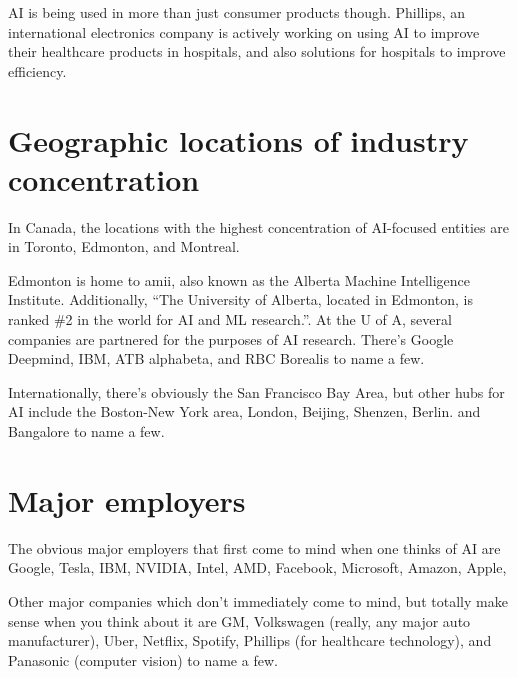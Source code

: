 \documentclass[letterpaper,12pt]{article}
\begin{document}
AI is being used in more than just consumer products though. Phillips,
an international electronics company is actively working on using
AI to improve their healthcare products in hospitals, and also 
solutions for hospitals to improve efficiency.




\section{Geographic locations of industry concentration}

In Canada, the locations with the highest concentration of AI-focused
entities are in Toronto, Edmonton, and Montreal.\cite{investincanada}

Edmonton is home to amii, also known as the Alberta Machine Intelligence Institute.
Additionally, ``The University of Alberta, located in Edmonton, is ranked \#2 in the world for AI and ML research.''\cite{investincanada}\cite{edmonton.ai}.
At the U of A, several companies are partnered for the purposes of AI research.
There's Google Deepmind, IBM, ATB alphabeta, and RBC Borealis to name a few.

Internationally, there's obviously the San Francisco Bay Area,
but other hubs for AI include
the Boston-New York area,
London,
Beijing,
Shenzen,
Berlin.
and Bangalore to name a few.\cite{aihubs}\cite{aihubsreview}

\section{Major employers}

The obvious major employers that first come to mind when one thinks of AI are
Google,
Tesla,
IBM,
NVIDIA, Intel, AMD,
Facebook,
Microsoft,
Amazon,
Apple,



Other major companies which don't immediately come to mind, but totally make sense when you think about it are
GM,
Volkswagen (really, any major auto manufacturer),
Uber,
Netflix,
Spotify,
Phillips (for healthcare technology),
and
Panasonic (computer vision) to name a few.\cite{surpriseai}
\end{document}
